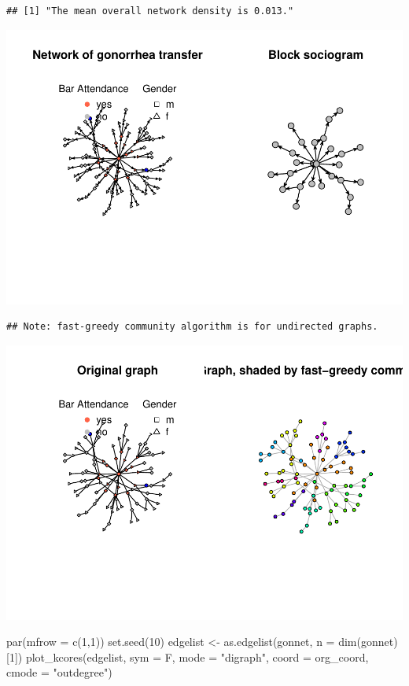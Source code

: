 \documentclass[12pt]{article}
\newenvironment{Shaded}{\begin{snugshade}}{\end{snugshade}}
\newcommand{\AttributeTok}[1]{\textcolor[rgb]{0.77,0.63,0.00}{#1}}
\newcommand{\DecValTok}[1]{\textcolor[rgb]{0.00,0.00,0.81}{#1}}
\newcommand{\FunctionTok}[1]{\textcolor[rgb]{0.00,0.00,0.00}{#1}}
\newcommand{\NormalTok}[1]{#1}
\newcommand{\OtherTok}[1]{\textcolor[rgb]{0.56,0.35,0.01}{#1}}
\newcommand{\StringTok}[1]{\textcolor[rgb]{0.31,0.60,0.02}{#1}}
\begin{document}
\begin{verbatim}
## [1] "The mean overall network density is 0.013."
\end{verbatim}

\includegraphics{JStevenRaquel-paper_files/figure-latex/blockmodel-1.pdf}

\begin{verbatim}
## Note: fast-greedy community algorithm is for undirected graphs.
\end{verbatim}

\includegraphics{JStevenRaquel-paper_files/figure-latex/plotting-fast-greedy-community-1.pdf}

\begin{Shaded}
\begin{Highlighting}[]
\FunctionTok{par}\NormalTok{(}\AttributeTok{mfrow =} \FunctionTok{c}\NormalTok{(}\DecValTok{1}\NormalTok{,}\DecValTok{1}\NormalTok{))}
\FunctionTok{set.seed}\NormalTok{(}\DecValTok{10}\NormalTok{)}
\NormalTok{edgelist }\OtherTok{\textless{}{-}} \FunctionTok{as.edgelist}\NormalTok{(gonnet, }\AttributeTok{n =} \FunctionTok{dim}\NormalTok{(gonnet)[}\DecValTok{1}\NormalTok{])}
\FunctionTok{plot\_kcores}\NormalTok{(edgelist, }\AttributeTok{sym =}\NormalTok{ F, }\AttributeTok{mode =} \StringTok{"digraph"}\NormalTok{, }
            \AttributeTok{coord =}\NormalTok{ org\_coord,}
            \AttributeTok{cmode =} \StringTok{"outdegree"}\NormalTok{)}
\end{Highlighting}
\end{Shaded}
\end{document}

